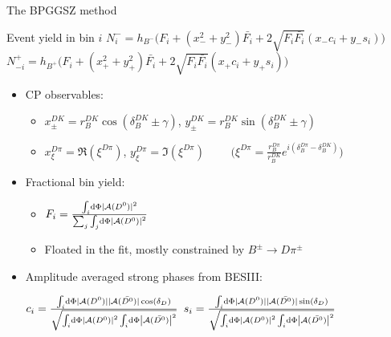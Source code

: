 \documentclass{beamer}
\begin{document}
\begin{frame}{The BPGGSZ method}
  \begin{block}{Event yield in bin $i$}
    \scriptsize
    $N^-_i = h_{B^-}\big(F_i + (x_-^2 + y_-^2)\bar{F_i} + 2\sqrt{F_i\bar{F_i}}(x_-c_i + y_-s_i)\big)$ \\
    $N^+_{-i} = h_{B^+}\big(F_i + (x_+^2 + y_+^2)\bar{F_i} + 2\sqrt{F_i\bar{F_i}}(x_+c_i + y_+s_i)\big)$
  \end{block}
  \begin{itemize}
    \item{CP observables:}
    \begin{itemize}
      \item{$x_\pm^{DK} = r_B^{DK}\cos(\delta_B^{DK}\pm\gamma)$, \quad $y_\pm^{DK} = r_B^{DK}\sin(\delta_B^{DK}\pm\gamma)$}
      \item{$x_\xi^{D\pi} = \Re(\xi^{D\pi})$, $y_\xi^{D\pi} = \Im(\xi^{D\pi})$ $\quad\quad\Big(\xi^{D\pi} = \frac{r_B^{D\pi}}{r_B^{DK}}e^{i(\delta_B^{D\pi} - \delta_B^{DK})}\Big)$}
    \end{itemize}
    \item{Fractional bin yield:}
    \begin{itemize}
      \item{$F_i = \frac{\int_i\dd{\Phi}|\mathcal{A}(D^0)|^2}{\sum_j\int_j\dd{\Phi}\abs{\mathcal{A}(D^0)}^2}$}
      \item{Floated in the fit, mostly constrained by $B^\pm\to D\pi^\pm$}
    \end{itemize}
  \end{itemize}
  \begin{itemize}
    \item{Amplitude averaged strong phases from BESIII:}
    \begin{center}
      $c_i = \frac{\int_i\dd{\Phi}|\mathcal{A}(D^0)||\mathcal{A}(\bar{D^0})|\cos(\delta_D)}{\sqrt{\int_i\dd{\Phi}\abs{\mathcal{A}(D^0)}^2\int_i\dd{\Phi}\abs{\mathcal{A}(\bar{D^0})}^2}}$ \quad $s_i = \frac{\int_i\dd{\Phi}|\mathcal{A}(D^0)||\mathcal{A}(\bar{D^0})|\sin(\delta_D)}{\sqrt{\int_i\dd{\Phi}\abs{\mathcal{A}(D^0)}^2\int_i\dd{\Phi}\abs{\mathcal{A}(\bar{D^0})}^2}}$
    \end{center}
  \end{itemize}
\end{frame}
\end{document}
